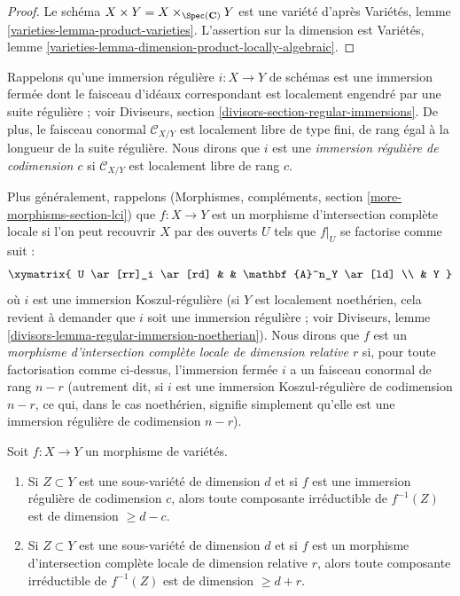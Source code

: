 \begin{proof}
Le schéma $X \times Y = X \times_{\Spec(\mathbf{C})} Y$ est une variété d'après
Variétés, lemme \ref{varieties-lemma-product-varieties}.
L'assertion sur la dimension est
Variétés, lemme \ref{varieties-lemma-dimension-product-locally-algebraic}.
\end{proof}

\noindent
Rappelons qu'une immersion régulière $i : X \to Y$ de schémas
est une immersion fermée dont le
faisceau d'idéaux correspondant est localement engendré par une suite régulière ; voir
Diviseurs, section \ref{divisors-section-regular-immersions}.
De plus, le faisceau conormal $\mathcal{C}_{X/Y}$ est localement libre de type fini, de
rang égal à la longueur de la suite régulière. Nous dirons que $i$ est une
{\it immersion régulière de codimension $c$}
si $\mathcal{C}_{X/Y}$ est localement libre de rang $c$.

\medskip\noindent
Plus généralement, rappelons
(Morphismes, compléments, section \ref{more-morphisms-section-lci})
que $f : X \to Y$ est un morphisme d'intersection complète locale
si l'on peut recouvrir $X$ par des ouverts $U$ tels que $f|_U$ se factorise
comme suit :
$$
\xymatrix{
U \ar[rr]_i \ar[rd] & & \mathbf{A}^n_Y \ar[ld] \\
& Y
}
$$
où $i$ est une immersion Koszul-régulière (si $Y$ est localement noethérien,
cela revient à demander que $i$ soit une immersion régulière ; voir
Diviseurs, lemme \ref{divisors-lemma-regular-immersion-noetherian}).
Nous dirons que $f$ est un {\it morphisme d'intersection complète locale
de dimension relative $r$} si, pour toute factorisation comme ci-dessus,
l'immersion fermée $i$ a un faisceau conormal de rang $n - r$ (autrement
dit, si $i$ est une immersion Koszul-régulière de codimension $n - r$,
ce qui, dans le cas noethérien, signifie simplement qu'elle est une immersion régulière de
codimension $n - r$).

\begin{lemma}
\label{lemma-pullback-by-regular-immersion}
Soit $f : X \to Y$ un morphisme de variétés.
\begin{enumerate}
\item Si $Z \subset Y$ est une sous-variété de dimension $d$ et si $f$ est une
immersion régulière de codimension $c$, alors toute composante irréductible
de $f^{-1}(Z)$ est de dimension $\geq d - c$.
\item Si $Z \subset Y$ est une sous-variété de dimension $d$ et si
$f$ est un morphisme d'intersection complète locale de dimension relative $r$,
alors toute composante irréductible de $f^{-1}(Z)$ est de dimension $\geq d + r$.
\end{enumerate}
\end{lemma}

